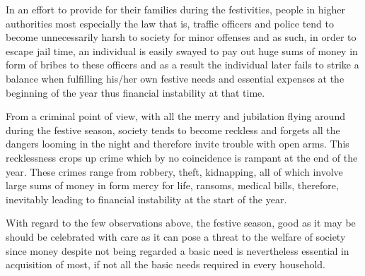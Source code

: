 \documentclass[12pt,a4paper]{article}
\begin{document}
In an effort to provide for their families during the festivities, people in higher authorities most especially the law that is, traffic officers and police tend to become unnecessarily harsh to society for minor offenses and as such, in order to escape jail time, an individual is easily swayed to pay out huge sums of money in form of bribes to these officers and as a result the individual later fails to strike a balance when fulfilling his/her own festive needs and essential expenses at the beginning of the year thus financial instability at that time.

From a criminal point of view, with all the merry and jubilation flying around during the festive season, society tends to become reckless and forgets all the dangers looming in the night and therefore invite trouble with open arms. This recklessness crops up crime which by no coincidence is rampant at the end of the year. These crimes range from robbery, theft, kidnapping, all of which involve large sums of money in form mercy for life, ransoms, medical bills, therefore, inevitably leading to financial instability at the start of the year.

With regard to the few observations above, the festive season, good as it may be should be celebrated with care as it can pose a threat to the welfare of society since money despite not being regarded a basic need is nevertheless essential in acquisition of most, if not all the basic needs required in every household.
\end{document}
